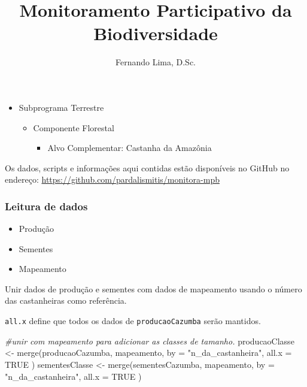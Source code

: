 \documentclass[
]{article}
\title{Monitoramento Participativo da Biodiversidade}
\author{Fernando Lima, D.Sc.}
\date{}
\newenvironment{Shaded}{\begin{snugshade}}{\end{snugshade}}
\newcommand{\AttributeTok}[1]{\textcolor[rgb]{0.77,0.63,0.00}{#1}}
\newcommand{\CommentTok}[1]{\textcolor[rgb]{0.56,0.35,0.01}{\textit{#1}}}
\newcommand{\ConstantTok}[1]{\textcolor[rgb]{0.00,0.00,0.00}{#1}}
\newcommand{\FunctionTok}[1]{\textcolor[rgb]{0.00,0.00,0.00}{#1}}
\newcommand{\NormalTok}[1]{#1}
\newcommand{\OtherTok}[1]{\textcolor[rgb]{0.56,0.35,0.01}{#1}}
\newcommand{\StringTok}[1]{\textcolor[rgb]{0.31,0.60,0.02}{#1}}
\providecommand{\tightlist}{%
  \setlength{\itemsep}{0pt}\setlength{\parskip}{0pt}}
\begin{document}
\maketitle

\begin{itemize}
\item
  Subprograma Terrestre

  \begin{itemize}
  \item
    Componente Florestal

    \begin{itemize}
    \tightlist
    \item
      Alvo Complementar: Castanha da Amazônia
    \end{itemize}
  \end{itemize}
\end{itemize}

Os dados, scripts e informações aqui contidas estão disponíveis no
GitHub no endereço: \url{https://github.com/pardalismitis/monitora-mpb}

\hypertarget{leitura-de-dados}{%
\subsubsection{Leitura de dados}\label{leitura-de-dados}}

\begin{itemize}
\item
  Produção
\item
  Sementes
\item
  Mapeamento
\end{itemize}

Unir dados de produção e sementes com dados de mapeamento usando o
número das castanheiras como referência.

\texttt{all.x} define que todos os dados de \texttt{producaoCazumba}
serão mantidos.

\begin{Shaded}
\begin{Highlighting}[]
\CommentTok{\#unir com mapeamento para adicionar as classes de tamanho.}
\NormalTok{producaoClasse }\OtherTok{\textless{}{-}} \FunctionTok{merge}\NormalTok{(producaoCazumba,}
\NormalTok{                        mapeamento,}
                        \AttributeTok{by =} \StringTok{"n\_da\_castanheira"}\NormalTok{,}
                        \AttributeTok{all.x =} \ConstantTok{TRUE}
\NormalTok{                        )}
\NormalTok{sementesClasse }\OtherTok{\textless{}{-}} \FunctionTok{merge}\NormalTok{(sementesCazumba,}
\NormalTok{                        mapeamento,}
                        \AttributeTok{by =} \StringTok{"n\_da\_castanheira"}\NormalTok{,}
                        \AttributeTok{all.x =} \ConstantTok{TRUE}
\NormalTok{                        )}
\end{Highlighting}
\end{Shaded}
\end{document}
